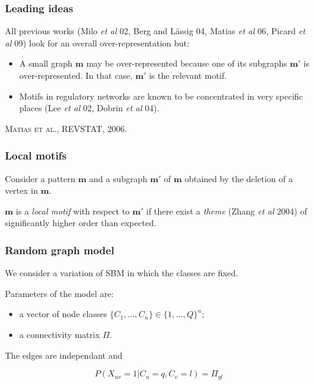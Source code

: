 \documentclass{beamer}
\newcommand{\mot}{\mathbf{m}}
\begin{document}
\begin{frame}
\frametitle{Leading ideas}

All previous works (Milo {\em et al} 02, Berg and L\"assig 04, Matias {\em et al} 06, Picard {\em et al} 09) look for an overall over-representation but:

\begin{itemize}
\item A small graph $\mot$  may be over-represented because one of its subgraphs  $\mot'$ is over-represented. 
In that case, $\mot'$ is the relevant motif. 
\item Motifs in regulatory networks are known to be concentrated in very specific places (Lee {\em et al} 02, Dobrin {\em et al} 04).  
\end{itemize}

{\tiny \textsc{Matias et al.}, REVSTAT, 2006.}

\end{frame}




\begin{frame}
\frametitle{ Local motifs}

Consider a pattern $\mot$ and a subgraph $\mot'$ of $\mot$ obtained by the deletion of a vertex in $\mot$.

\begin{figure} [htb] 
\begin{center}
\psfrag{mp}{$\mot'$}
\psfrag{m}{$\mot$}
\end{center}
\end{figure}



$\mot$ is a {\em local motif} with respect to $\mot'$ if there exist a {\em theme} (Zhang {\em et al} 2004) of significantly higher order than expected. 
 

\begin{figure} [htb] 
\begin{center}
\psfrag{mp}{$\mot'$}
\end{center}
\end{figure}
\end{frame}



\begin{frame}
\frametitle{Random graph model}

We consider a variation of SBM in which the classes are fixed.

Parameters of the model are:
\begin{itemize}
\item a vector of node classes $\{C_1,\ldots ,C_n\}\in \{1,\ldots,Q\}^n$;
\item a connectivity matrix $\Pi$. 
\end{itemize}

The edges are independant and

$$ P(X_{uv}=1 | C_u=q,C_v=l) = \Pi_{ql} $$

\end{frame}
\end{document}
